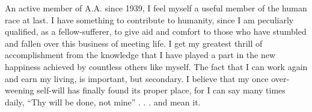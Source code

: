 \begin{biblechapter}
An active member of A.A. since 1939, I feel myself a useful member of the human race at last. I have something to contribute to humanity, since I am peculiarly qualified, as a fellow-sufferer, to give aid and comfort to those who have stumbled and fallen over this business of meeting life. I get my greatest thrill of accomplishment from the knowledge that I have played a part in the new happiness achieved by countless others like myself. The fact that I can work again and earn my living, is important, but secondary. I believe that my once over-weening self-will has finally found its proper place, for I can say many times daily, “Thy will be done, not mine” . . . and mean it.

\end{biblechapter}

